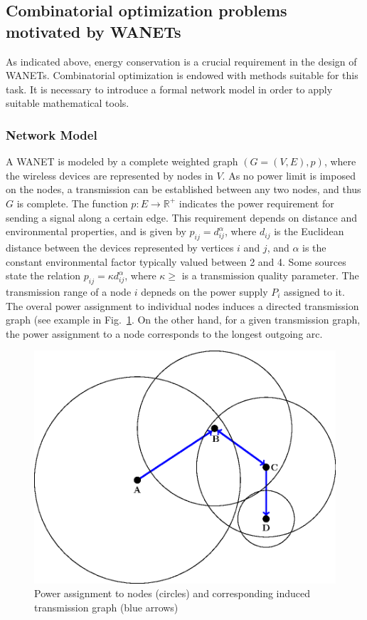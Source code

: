 \subsection{Combinatorial optimization problems motivated by WANETs}

As indicated above, energy conservation is a crucial requirement in the design of WANETs. 
Combinatorial optimization is endowed with methods suitable for this task. 
It is necessary to introduce a formal network model in order to apply suitable mathematical tools.

\subsubsection{Network Model}

A WANET is modeled by a complete weighted graph $(G=(V,E),p)$, where the wireless devices are represented by nodes in $V$. 
As no power limit is imposed on the nodes, a transmission can be established between any two nodes, and thus $G$ is complete.
The function $p:E\to \mathbb{R}^+$ indicates the power requirement for sending a signal along a certain edge.
This requirement depends on distance and environmental properties, and is given by  $p_{ij}=d_{ij}^\alpha$, 
where $d_{ij}$ is the Euclidean distance between the devices represented by vertices $i$ and $j$, and $\alpha$ is the constant environmental factor typically valued between 2 and 4. 
Some sources state the relation $p_{ij}=\kappa d_{ij}^\alpha$, where $\kappa\geq$ is a transmission quality parameter.
The transmission range of a node $i$ depneds on the power supply $P_i$ assigned to it.
The overal power assignment to individual nodes induces a directed transmission graph (see example in Fig.~\ref{fig:transgraph}. 
On the other hand, for a given transmission graph, the power assignment to a node corresponds to the longest outgoing arc.
\begin{figure}[htb!]
  \centering
  \includegraphics[scale=.8]{figurer/tran-graph.eps}
  \caption{Power assignment to nodes (circles)  and corresponding induced transmission graph (blue arrows)}
  \label{fig:transgraph}
\end{figure}
